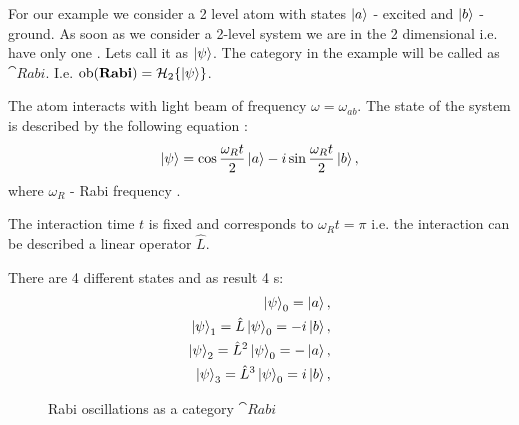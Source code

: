 \begin{example}  
  \label{ex:rabioscillations}
  For our example we consider a 2 level atom with states $\ket{a}$ -
  excited and $\ket{b}$ - ground.
  As soon as we consider a 2-level system we are in the 2 dimensional
   i.e. have only one
  . Lets call 
  it as $\ket{\psi}$. The category in the example will be called as
  $\cat{Rabi}$. I.e. $\mathrm{ob}(\mathbf{Rabi}) = \mathcal{H}_2
  \{\ket{\psi}\}$.  

  The atom interacts with light beam of
  frequency $\omega = \omega_{ab}$. The state of the system is
  described by the following equation \cite{bib:quantum_optics_mine}:
  \begin{equation}
    \ket{\psi} = \cos{\frac{\omega_R t}{2}} \ket{a} -
      i \sin{\frac{\omega_R t}{2}} \ket{b},
    \nonumber
  \end{equation}
  where $\omega_R$ - Rabi frequency \cite{bib:quantum_optics_mine}. 

  The interaction time $t$ is fixed and corresponds to $\omega_R t =
  \pi$ i.e. the interaction can be described a linear operator $\hat{L}$.
  
  There are 4 different states and as result 4
  s:
  \begin{eqnarray}
    \ket{\psi}_0 = \ket{a},
    \nonumber \\
    \ket{\psi}_1 = \hat{L} \ket{\psi}_0 = -i \ket{b},
    \nonumber \\
    \ket{\psi}_2 = \hat{L}^2 \ket{\psi}_0 = - \ket{a},
    \nonumber \\
    \ket{\psi}_3 = \hat{L}^3 \ket{\psi}_0 = i \ket{b},
    \nonumber
  \end{eqnarray}

\begin{figure}
  \centering
  \caption{Rabi oscillations as a category $\cat{Rabi}$}
  \label{fig:example_quantum}
\end{figure}
\end{example}

